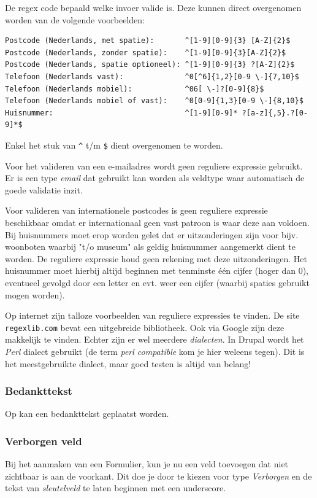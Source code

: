 De regex code bepaald welke invoer valide is. Deze kunnen direct overgenomen worden van de volgende voorbeelden:
\begin{verbatim}
Postcode (Nederlands, met spatie):       ^[1-9][0-9]{3} [A-Z]{2}$
Postcode (Nederlands, zonder spatie):    ^[1-9][0-9]{3}[A-Z]{2}$
Postcode (Nederlands, spatie optioneel): ^[1-9][0-9]{3} ?[A-Z]{2}$
Telefoon (Nederlands vast):              ^0[^6]{1,2}[0-9 \-]{7,10}$
Telefoon (Nederlands mobiel):            ^06[ \-]?[0-9]{8}$
Telefoon (Nederlands mobiel of vast):    ^0[0-9]{1,3}[0-9 \-]{8,10}$
Huisnummer:                              ^[1-9][0-9]* ?[a-z]{,5}.?[0-9]*$
\end{verbatim}
Enkel het stuk van \texttt{\^} t/m \texttt{\$} dient overgenomen te worden.

Voor het valideren van een e-mailadres wordt geen reguliere expressie gebruikt. Er is een type \emph{email} dat gebruikt kan worden als veldtype waar automatisch de goede validatie inzit.

Voor valideren van internationele postcodes is geen reguliere expressie beschikbaar omdat er internationaal geen vast patroon is waar deze aan voldoen. Bij huisnummers moet erop worden gelet dat er uitzonderingen zijn voor bijv. woonboten waarbij "t/o museum" als geldig huisnummer aangemerkt dient te worden. De reguliere expressie houd geen rekening met deze uitzonderingen. Het huisnummer moet hierbij altijd beginnen met tenminste \'{e}\'{e}n cijfer (hoger dan 0), eventueel gevolgd door een letter en evt. weer een cijfer (waarbij spaties gebruikt mogen worden).

Op internet zijn talloze voorbeelden van reguliere expressies te vinden. De site \texttt{regexlib.com} bevat een uitgebreide bibliotheek. Ook via Google zijn deze makkelijk te vinden. Echter zijn er wel meerdere \emph{dialecten}. In Drupal wordt het \emph{Perl} dialect gebruikt (de term \emph{perl compatible} kom je hier weleens tegen). Dit is het meestgebruikte dialect, maar goed testen is altijd van belang!

\subsubsection{Bedankttekst}
Op  kan een bedankttekst geplaatst worden.


\subsubsection{Verborgen veld}
Bij het aanmaken van een Formulier, kun je nu een veld toevoegen dat niet zichtbaar is aan de voorkant. Dit doe je door te kiezen voor type \emph{Verborgen} en de tekst van \emph{sleutelveld} te laten beginnen met een underscore.

